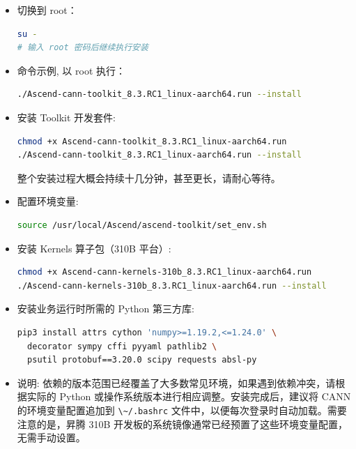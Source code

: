 \begin{itemize}
\item
  切换到 root：

\begin{lstlisting}[language=bash]
su -
# 输入 root 密码后继续执行安装
\end{lstlisting}
\item
  命令示例, 以 root 执行：

\begin{lstlisting}[language=bash]
./Ascend-cann-toolkit_8.3.RC1_linux-aarch64.run --install
\end{lstlisting}
\item
  安装 Toolkit 开发套件:

\begin{lstlisting}[language=bash]
chmod +x Ascend-cann-toolkit_8.3.RC1_linux-aarch64.run 
./Ascend-cann-toolkit_8.3.RC1_linux-aarch64.run --install
\end{lstlisting}

  整个安装过程大概会持续十几分钟，甚至更长，请耐心等待。
\item
  配置环境变量:

\begin{lstlisting}[language=bash]
source /usr/local/Ascend/ascend-toolkit/set_env.sh
\end{lstlisting}
\item
  安装 Kernels 算子包（310B 平台）:

\begin{lstlisting}[language=bash]
chmod +x Ascend-cann-kernels-310b_8.3.RC1_linux-aarch64.run
./Ascend-cann-kernels-310b_8.3.RC1_linux-aarch64.run --install
\end{lstlisting}
\item
  安装业务运行时所需的 Python 第三方库:

\begin{lstlisting}[language=bash]
pip3 install attrs cython 'numpy>=1.19.2,<=1.24.0' \
  decorator sympy cffi pyyaml pathlib2 \
  psutil protobuf==3.20.0 scipy requests absl-py
\end{lstlisting}
\item
  说明:
  依赖的版本范围已经覆盖了大多数常见环境，如果遇到依赖冲突，请根据实际的
  Python 或操作系统版本进行相应调整。安装完成后，建议将 CANN
  的环境变量配置追加到 \passthrough{\lstinline!\~/.bashrc!}
  文件中，以便每次登录时自动加载。需要注意的是，昇腾 310B
  开发板的系统镜像通常已经预置了这些环境变量配置，无需手动设置。
\end{itemize}

